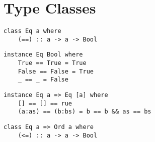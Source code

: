 \section{Type Classes}


\begin{verbatim}
class Eq a where
    (==) :: a -> a -> Bool
\end{verbatim}

\begin{verbatim}
instance Eq Bool where
    True == True = True
    False == False = True
    _ == _ = False
\end{verbatim}

\begin{verbatim}
instance Eq a => Eq [a] where
    [] == [] == rue
    (a:as) == (b:bs) = b == b && as == bs
\end{verbatim}

\begin{verbatim}
class Eq a => Ord a where
    (<=) :: a -> a -> Bool
\end{verbatim}
